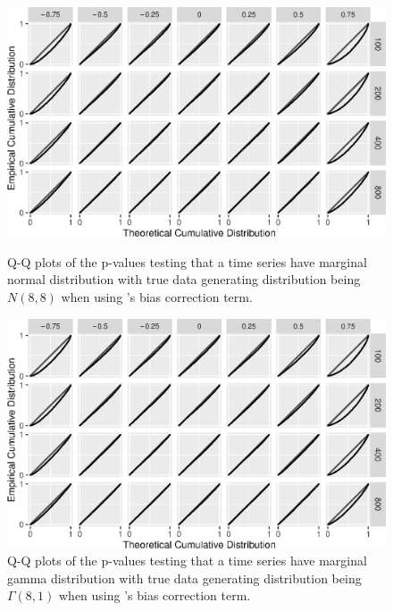 \documentclass[12pt]{article}
\begin{document}
\begin{figure}[tbp]
  \includegraphics[width = .9\textwidth]{figures/normal_C_n}
  \centering
  \vspace{-10pt}
  \caption{Q-Q plots of the p-values testing that a time series
    have marginal normal distribution with true data generating distribution
    being $N(8,8)$ when using \citet{babu2004goodness}'s bias correction term.}
  \label{fig:qq_n_C_n}
    \hspace{3cm}
  \includegraphics[width = .9\textwidth]{figures/gamma_C_n}
  \vspace{-5pt}
  \caption{Q-Q plots of the p-values testing that a time series
    have marginal gamma distribution with true data generating distribution
    being $\Gamma(8,1)$ when using \citet{babu2004goodness}'s bias correction term.}
  \label{fig:qq_g_C_n}
\end{figure}
\end{document}

